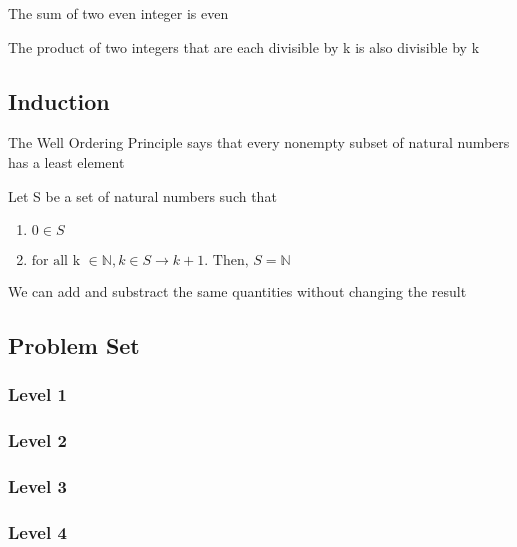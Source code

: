 \documentclass{article}
\begin{document}
\begin{theorem}
    The sum of two even integer is even
\end{theorem}

\begin{theorem}
    The product of two integers that are each divisible by k is also divisible by k
\end{theorem}

\subsection{Induction}

\begin{definition}
    The Well Ordering Principle says that every nonempty subset of natural numbers
    has a least element
\end{definition}

\begin{theorem}
    Let S be a set of natural numbers such that
    \begin{enumerate}
	\item $ 0 \in S $
	\item $ \text{for all k } \in \mathbb{N} , k \in S \rightarrow k+1.
	    \text{ Then, } S= \mathbb{N} $
    \end{enumerate}
\end{theorem}

\begin{lemma}
    We can add and substract the same quantities without changing the result
\end{lemma}

\subsection{Problem Set}
\subsubsection{Level 1}
\subsubsection{Level 2}
\subsubsection{Level 3}
\subsubsection{Level 4}
\end{document}
